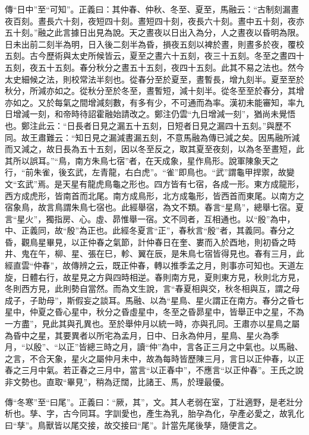 {\noindent\zhuan{}\fzbyks 傳“日中”至“可知”。正義曰：其仲春、仲秋、冬至、夏至，馬融云：“古制刻漏晝夜百刻。晝長六十刻，夜短四十刻。晝短四十刻，夜長六十刻。晝中五十刻，夜亦五十刻。”融之此言據日出見為說。天之晝夜以日出入為分，人之晝夜以昏明為限。日未出前二刻半為明，日入後二刻半為昏，損夜五刻以裨於晝，則晝多於夜，覆校五刻。古今歷術與太史所候皆云，夏至之晝六十五刻，夜三十五刻。冬至之晝四十五刻，夜五十五刻。春分秋分之晝五十五刻，夜四十五刻。此其不易之法也。然今太史細候之法，則校常法半刻也。從春分至於夏至，晝暫長，增九刻半。夏至至於秋分，所減亦如之。從秋分至於冬至，晝暫短，減十刻半。從冬至至於春分，其增亦如之。又於每氣之間增減刻數，有多有少，不可通而為率。漢初未能審知，率九日增減一刻，和帝時待詔霍融始請改之。鄭注仍雲“九日增減一刻”，猶尚未覺悟也。鄭注此云：“日長者日見之漏五十五刻，日短者日見之漏四十五刻。”與歷不同。故王肅難云：“知日見之漏減晝漏五刻，不意馬融為傳已減之矣。因馬融所減而又減之，故日長為五十五刻，因以冬至反之，取其夏至夜刻，以為冬至晝短，此其所以誤耳。”“鳥，南方朱鳥七宿”者，在天成象，星作鳥形。說軍陳象天之行，“前朱雀，後玄武，左青龍，右白虎”。“雀”即鳥也。“武”謂龜甲捍禦，故變文“玄武”焉。是天星有龍虎鳥龜之形也。四方皆有七宿，各成一形。東方成龍形，西方成虎形，皆南首而北尾。南方成鳥形，北方成龜形，皆西首而東尾。以南方之宿象鳥，故言鳥謂朱鳥七宿也。此經舉宿，為文不類。春言“星鳥”，總舉七宿。夏言“星火”，獨指房、心。虛、昴惟舉一宿。文不同者，互相通也。以“殷”為中，中、正義同，故“殷”為正也。此經冬夏言“正”，春秋言“殷”者，其義同。春分之昏，觀鳥星畢見，以正仲春之氣節，計仲春日在奎、婁而入於酉地，則初昏之時井、鬼在午，柳、星、張在巳，軫、翼在辰，是朱鳥七宿皆得見也。春有三月，此經直雲“仲春”，故傳辨之云，既正仲春，轉以推季孟之月，則事亦可知也。天道左旋，日體右行，故星見之方與四時相逆。春則南方見，夏則東方見，秋則北方見，冬則西方見，此則勢自當然。而為文生說，言“春夏相與交，秋冬相與互，謂之母成子，子助母”，斯假妄之談耳。馬融、以為“星鳥、星火謂正在南方。春分之昏七星中，仲夏之昏心星中，秋分之昏虛星中，冬至之昏昴星中，皆舉正中之星，不為一方盡”，見此其與孔異也。至於舉仲月以統一時，亦與孔同。王肅亦以星鳥之屬為昏中之星，其要異者以所宅為孟月，日中、日永為仲月，星鳥、星火為季月，“以殷”、“以正”皆總三時之月，讀“仲”為中，言各正三月之中氣也。以馬融、之言，不合天象，星火之屬仲月未中，故為每時皆歷陳三月，言日以正仲春，以正春之三月中氣。若正春之三月中，當言“以正春中”，不應言“以正仲春”。王氏之說非文勢也。直取“畢見”，稍為迂闊，比諸王、馬，於理最優。 \par}

{\noindent\zhuan{}\fzbyks 傳“冬寒”至“曰尾”。正義曰：“厥，其”，文。其人老弱在室，丁壯適野，是老壯分析也。孳、字，古今同耳。字訓愛也，產生為乳，胎孕為化，孕產必愛之，故乳化曰“孳”。鳥獸皆以尾交接，故交接曰“尾”。計當先尾後孳，隨便言之。 \par}

